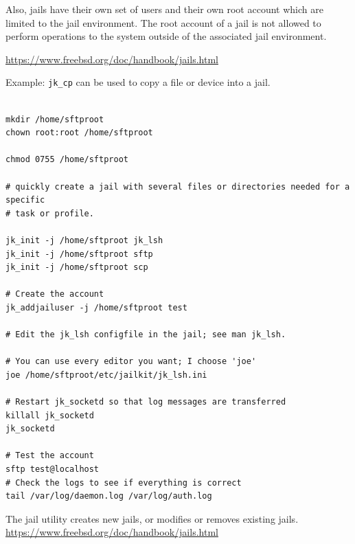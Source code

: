 Also, jails have their own set of users and their own root account which are
limited to the jail environment. The root account of a jail is not allowed to
perform operations to the system outside of the associated jail environment.

\url{https://www.freebsd.org/doc/handbook/jails.html}

%  

Example: 
\verb!jk_cp! can be used to copy a file or device into a jail.
\begin{verbatim}

mkdir /home/sftproot
chown root:root /home/sftproot

chmod 0755 /home/sftproot

# quickly create a jail with several files or directories needed for a specific
# task or profile.

jk_init -j /home/sftproot jk_lsh
jk_init -j /home/sftproot sftp
jk_init -j /home/sftproot scp

# Create the account
jk_addjailuser -j /home/sftproot test

# Edit the jk_lsh configfile in the jail; see man jk_lsh.

# You can use every editor you want; I choose 'joe'
joe /home/sftproot/etc/jailkit/jk_lsh.ini

# Restart jk_socketd so that log messages are transferred
killall jk_socketd
jk_socketd

# Test the account
sftp test@localhost
# Check the logs to see if everything is correct
tail /var/log/daemon.log /var/log/auth.log

\end{verbatim}



The jail utility creates new jails, or modifies or	removes	existing
jails.   \url{https://www.freebsd.org/doc/handbook/jails.html}

